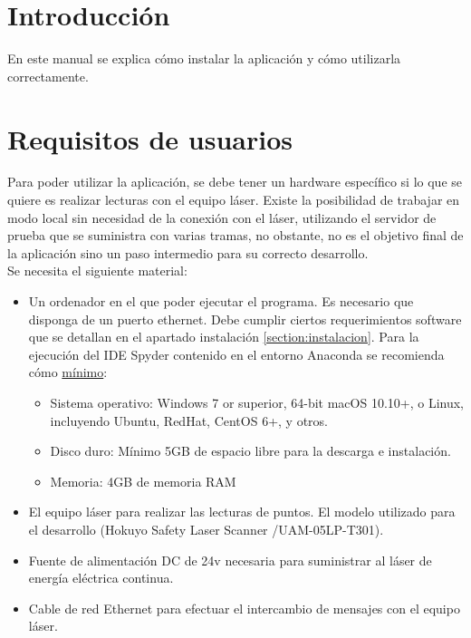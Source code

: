 
\section{Introducción}
En este manual se explica cómo instalar la aplicación y cómo utilizarla correctamente.

\section{Requisitos de usuarios}

Para poder utilizar la aplicación, se debe tener un hardware específico si lo que se quiere es realizar lecturas con el equipo láser. Existe la posibilidad de trabajar en modo local sin necesidad de la conexión con el láser, utilizando el servidor de prueba que se suministra con varias tramas, no obstante, no es el objetivo final de la aplicación sino un paso intermedio para su correcto desarrollo.\\
Se necesita el siguiente material:\\
\begin{itemize}
\item Un ordenador en el que poder ejecutar el programa. Es necesario que disponga de un puerto ethernet. Debe cumplir ciertos requerimientos software que se detallan en el apartado instalación \ref{section:instalacion}. Para la ejecución del IDE Spyder contenido en el entorno Anaconda se recomienda cómo \href{https://docs.anaconda.com/anaconda/install/}{mínimo}:
\begin{itemize}
\tightlist


\item Sistema operativo: Windows 7 or superior, 64-bit macOS 10.10+, o Linux, incluyendo Ubuntu, RedHat, CentOS 6+, y otros.
\item Disco duro: Mínimo 5GB de espacio libre para la descarga e instalación.
\item Memoria: 4GB de memoria RAM
\end{itemize}


\item El equipo láser para realizar las lecturas de puntos. El modelo utilizado para el desarrollo (Hokuyo Safety Laser Scanner /UAM-05LP-T301).
\item Fuente de alimentación DC de 24v necesaria para suministrar al láser de energía eléctrica continua.
\item Cable de red Ethernet para efectuar el intercambio de mensajes con el equipo láser.
\end{itemize}
